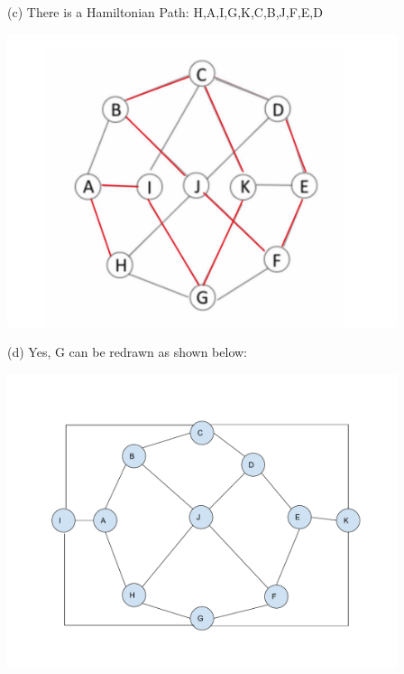 \documentclass{article}
\begin{document}
\begin{solution}
\noindent (c) There is a Hamiltonian Path: H,A,I,G,K,C,B,J,F,E,D

\begin{center}
\includegraphics[width=4.5in]{HW5_pics/HW5Solution3c.pdf}
\end{center}

\noindent (d) Yes, G can be redrawn as shown below:

\begin{center}
\includegraphics[width=4.5in]{HW5_pics/HW5Solution3d.pdf}
\end{center}

\end{solution}
\end{document}
